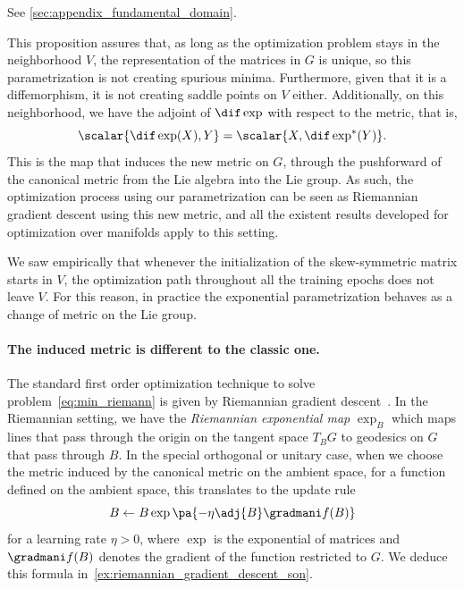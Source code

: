 \begin{demo}
    See \ref{sec:appendix_fundamental_domain}.
\end{demo}

This proposition assures that, as long as the optimization problem stays in the neighborhood $V$, the representation of the matrices in $G$ is unique, so this parametrization is not creating spurious minima. Furthermore, given that it is a diffemorphism, it is not creating saddle points on $V$ either. Additionally, on this neighborhood, we have the adjoint of $\dif \exp$ with respect to the metric, that is,
\[
    \scalar{\dif \exp (X), Y} = \scalar{X, \dif \exp^\ast (Y)}.
\]
This is the map that induces the new metric on $G$, through the pushforward of the canonical metric from the Lie algebra into the Lie group. As such, the optimization process using our parametrization can be seen as Riemannian gradient descent using this new metric, and all the existent results developed for optimization over manifolds apply to this setting.

\begin{remark}
We saw empirically that whenever the initialization of the skew-symmetric matrix starts in $V$, the optimization path throughout all the training epochs does not leave $V$. For this reason, in practice the exponential parametrization behaves as a change of metric on the Lie group.
\end{remark}

\paragraph{The induced metric is different to the classic one.} The standard first order optimization technique to solve problem~\eqref{eq:min_riemann} is given by Riemannian gradient descent~\cite{absil2009optimization}. In the Riemannian setting, we have the \emph{Riemannian exponential map} $\exp_B$ which maps lines that pass through the origin on the tangent space $T_B G$ to geodesics on $G$ that pass through $B$. In the special orthogonal or unitary case, when we choose the metric induced by the canonical metric on the ambient space, for a function defined on the ambient space, this translates to the update rule
\[
    B \gets B\exp\pa{-\eta\adj{B}\gradmani f(B)}
\]
for a learning rate $\eta > 0$, where $\exp$ is the exponential of matrices and $\gradmani f(B)$ denotes the gradient of the function restricted to $G$. We deduce this formula in~\ref{ex:riemannian_gradient_descent_son}.

